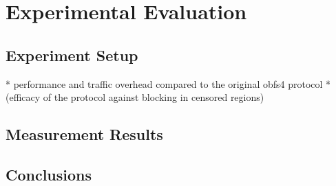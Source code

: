 \chapter{Experimental Evaluation}\label{ch:results}

\section{Experiment Setup} \label{sec:tbd}

* performance and traffic overhead compared to the original obfs4 protocol
* (efficacy of the protocol against blocking in censored regions)

\section{Measurement Results} \label{sec:tbd}

\section{Conclusions} \label{sec:tbd}
